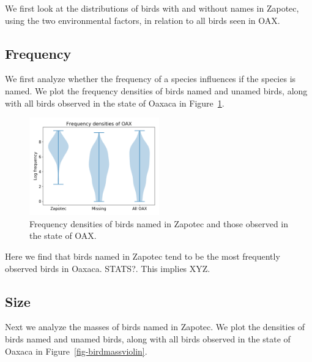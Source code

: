 \documentclass[10pt,letterpaper]{article}
\begin{document}
We first look at the distributions of birds with and without names in Zapotec, using the two environmental factors, in relation to all birds seen in OAX.


\subsection{Frequency}
We first analyze whether the frequency of a species influences if the species is named. We plot the frequency densities of birds named and unamed birds, along with all birds observed in the state of Oaxaca in Figure~\ref{fig-birdfreqviolin}.

\begin{figure}[h!]
  \begin{center}
    \includegraphics[width=0.5\textwidth]{./figures/birdfreq-violinplots.png}
        \caption{Frequency densities of birds named in Zapotec and those observed in the state of OAX.}
        \label{fig-birdfreqviolin}
  \end{center}
\end{figure}

Here we find that birds named in Zapotec tend to be the most frequently observed birds in Oaxaca. STATS?. This implies XYZ.

\subsection{Size}
Next we analyze the masses of birds named in Zapotec. We plot the densities of birds named and unamed birds, along with all birds observed in the state of Oaxaca in Figure~\ref{fig-birdmassviolin}.
\end{document}
